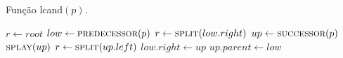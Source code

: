 \begin{algorithm}
    \caption{Função lcand$(p)$.} \label{parestatico:lcand}
\begin{algorithmic}[1]
        \State $r \leftarrow root$
        \State $low \leftarrow \Call{predecessor}{p}$
            \State {}
            \State $r \leftarrow \Call{split}{low.right}$
        \EndIf
        \State $up \leftarrow \Call{successor}{p}$
            \State $\Call{splay}{up}$
            \State $r \leftarrow \Call{split}{up.left}$
        \EndIf
            \State $low.right \leftarrow up$
            \State $up.parent \leftarrow low$
        \EndIf
        \State {}
    \EndFunction
\end{algorithmic}
\end{algorithm}